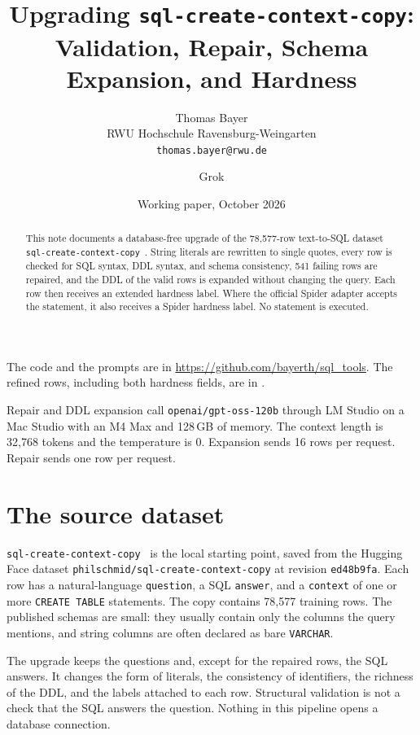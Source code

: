 \documentclass[11pt,a4paper]{article}
\title{Upgrading \texttt{sql-create-context-copy}:\\
Validation, Repair, Schema Expansion, and Hardness}
\author{Thomas Bayer\\
RWU Hochschule Ravensburg-Weingarten\\
\texttt{thomas.bayer@rwu.de}
\and
Grok}
\date{Working paper, October 2026}
\begin{document}
\maketitle

\begin{abstract}
This note documents a database-free upgrade of the 78{,}577-row text-to-SQL
dataset \texttt{sql-create-context-copy}~\cite{sqlcontextcopy}. String literals
are rewritten to single quotes, every row is checked for SQL syntax, DDL
syntax, and schema consistency, 541 failing rows are repaired, and the DDL of
the valid rows is expanded without changing the query. Each row then receives
an extended hardness label. Where the official Spider adapter accepts the
statement, it also receives a Spider hardness label. No statement is executed.
\end{abstract}

The code and the prompts are in \url{https://github.com/bayerth/sql_tools}.
The refined rows, including both hardness fields, are in
.

Repair and DDL expansion call \texttt{openai/gpt-oss-120b} through LM Studio on
a Mac Studio with an M4 Max and 128\,GB of memory. The context length is
32{,}768 tokens and the temperature is 0. Expansion sends 16 rows per request.
Repair sends one row per request.

\section{The source dataset}

\texttt{sql-create-context-copy}~\cite{sqlcontextcopy} is the local starting
point, saved from the Hugging Face dataset
\texttt{philschmid/sql-create-context-copy} at revision \texttt{ed48b9fa}.
Each row has a natural-language \texttt{question}, a SQL \texttt{answer}, and
a \texttt{context} of one or more \texttt{CREATE TABLE} statements. The copy
contains 78{,}577 training rows. The published schemas are small: they usually
contain only the columns the query mentions, and string columns are often
declared as bare \texttt{VARCHAR}.

The upgrade keeps the questions and, except for the repaired rows, the SQL
answers. It changes the form of literals, the consistency of identifiers, the
richness of the DDL, and the labels attached to each row. Structural
validation is not a check that the SQL answers the question. Nothing in this
pipeline opens a database connection.
\end{document}
